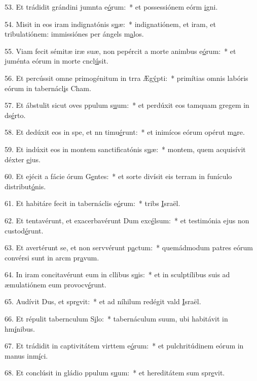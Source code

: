 53. Et trádidit grándini jumnta e\uline{ó}rum:~* et possessiónem eórm \uline{i}gni.\par 
54. Misit in eos iram indignatónis s\uline{u}æ:~* indignatiónem, et iram, et tribulatiónem: immissiónes per ángels m\uline{a}los.\par 
55. Viam fecit sémitæ iræ suæ, non pepércit a morte animbus e\uline{ó}rum:~* et juménta eórum in morte cncl\uline{ú}sit.\par 
56. Et percússit omne primogénitum in trra Æg\uline{ý}pti:~* primítias omnis labóris eórum in tabernácl\uline{i}s Cham.\par 
57. Et ábstulit sicut oves ppulum s\uline{u}um:~* et perdúxit eos tamquam gregem in ds\uline{é}rto.\par 
58. Et dedúxit eos in spe, et nn timu\uline{é}runt:~* et inimícos eórum opérut m\uline{a}re.\par 
59. Et indúxit eos in montem sanctificatónis s\uline{u}æ:~* montem, quem acquisívit déxter \uline{e}jus.\par 
60. Et ejécit a fácie órum G\uline{e}ntes:~* et sorte divísit eis terram in funículo distribut\uline{ó}nis.\par 
61. Et habitáre fecit in tabernáclis e\uline{ó}rum:~* tribs \uline{I}sraël.\par 
62. Et tentavérunt, et exacerbavérunt Dum exc\uline{é}lsum:~* et testimónia ejus non custod\uline{é}runt.\par 
63. Et avertérunt se, et non servvérunt p\uline{a}ctum:~* quemádmodum patres eórum convérsi sunt in arcm pr\uline{a}vum.\par 
64. In iram concitavérunt eum in cllibus s\uline{u}is:~* et in sculptílibus suis ad æmulatiónem eum provocv\uline{é}runt.\par 
65. Audívit Dus, et spr\uline{e}vit:~* et ad níhilum redégit vald \uline{I}sraël.\par 
66. Et répulit tabernculum S\uline{i}lo:~* tabernáculum suum, ubi habitávit in hm\uline{í}nibus.\par 
67. Et trádidit in captivitátem virttem e\uline{ó}rum:~* et pulchritúdinem eórum in manus inm\uline{í}ci.\par 
68. Et conclúsit in gládio ppulum s\uline{u}um:~* et hereditátem sum spr\uline{e}vit.\par 
